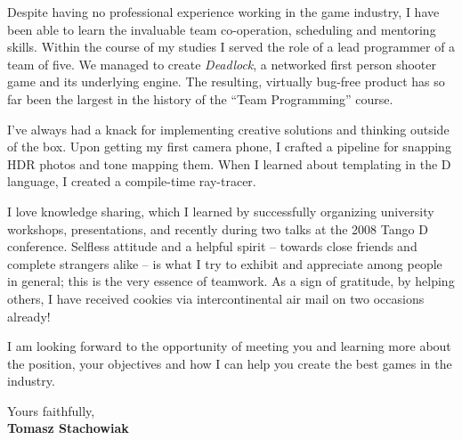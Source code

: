 \documentclass[11pt]{article}
\begin{document}
Despite having no professional experience working in the game industry, I have been able to learn the invaluable team co-operation, scheduling and mentoring skills. Within the course of my studies I served the role of a lead programmer of a team of five. We managed to create \emph{Deadlock}, a networked first person shooter game and its underlying engine. The resulting, virtually bug-free product has so far been the largest in the history of the ``Team Programming'' course.

I've always had a knack for implementing creative solutions and thinking outside of the box. Upon getting my first camera phone, I crafted a pipeline for snapping HDR photos and tone mapping them. When I learned about templating in the D language, I created a compile-time ray-tracer.

I love knowledge sharing, which I learned by successfully organizing university workshops, presentations, and recently during two talks at the 2008 Tango D conference. Selfless attitude and a helpful spirit -- towards close friends and complete strangers alike -- is what I try to exhibit and appreciate among people in general; this is the very essence of teamwork. As a sign of gratitude, by helping others, I have received cookies via intercontinental air mail on two occasions already!

I am looking forward to the opportunity of meeting you and learning more about the position, your objectives and how I can help you create the best games in the industry.


Yours faithfully,\\[2em] %
%
{\bfseries Tomasz Stachowiak}
%
\end{document}

